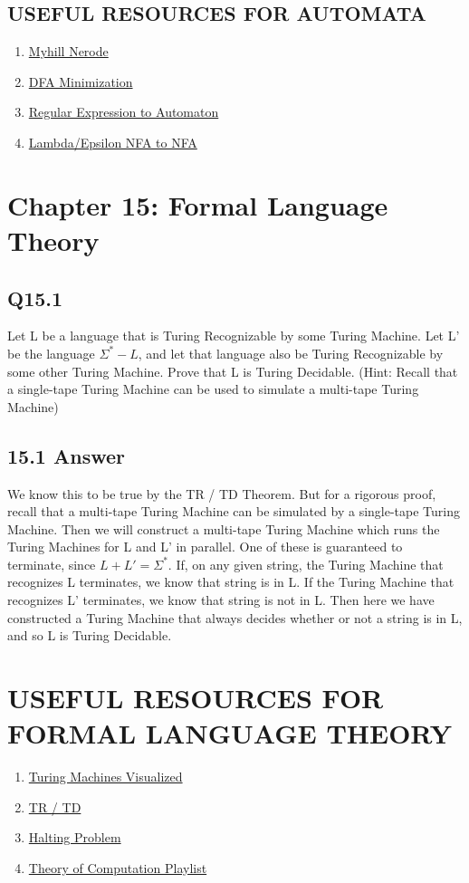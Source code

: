 \documentclass{article}
\begin{document}
\subsection{USEFUL RESOURCES FOR AUTOMATA}
\begin{enumerate}
    \item \href{https://www.youtube.com/watch?v=gjDPTy6fwbk}{Myhill Nerode}
    \item \href{https://www.youtube.com/watch?v=7W2lSrt8r-0&t=703s}{DFA Minimization}
    \item \href{https://www.youtube.com/watch?v=VbR1mGdP99s}{Regular Expression to Automaton}
    \item \href{https://www.youtube.com/watch?v=yXLZ9JbvEEg}{Lambda/Epsilon NFA to NFA}
\end{enumerate}
\newpage
\section*{Chapter 15: Formal Language Theory}
\subsection*{Q15.1}
Let L be a language that is Turing Recognizable by some Turing Machine. Let L' be the language $\Sigma^* - L$,
and let that language also be Turing Recognizable by some other Turing Machine. Prove that L is Turing Decidable.
(Hint: Recall that a single-tape Turing Machine can be used to simulate a multi-tape Turing Machine)
\newpage
\subsection*{15.1 Answer}
We know this to be true by the TR / TD Theorem. But for a rigorous proof, recall that a multi-tape Turing Machine can be simulated by
a single-tape Turing Machine. Then we will construct a multi-tape Turing Machine which runs the Turing Machines for L and L' in parallel. One of these
is guaranteed to terminate, since $L + L' = \Sigma^*$. If, on any given string, the Turing Machine that recognizes L terminates, 
we know that string is in L. If the Turing Machine that recognizes L' terminates, we know that string is not in L. Then here we have
constructed a Turing Machine that always decides whether or not a string is in L, and so L is Turing Decidable.
\newpage
\section*{USEFUL RESOURCES FOR FORMAL LANGUAGE THEORY}
\begin{enumerate}
    \item \href{https://www.youtube.com/watch?v=-ZS_zFg4w5k}{Turing Machines Visualized}
    \item \href{https://www.youtube.com/watch?v=sNWC1Zz6qcg}{TR / TD}
    \item \href{https://www.youtube.com/watch?v=VyHbd6sx5Po}{Halting Problem}
    \item \href{https://www.youtube.com/watch?v=SV57Yv8BXBc&list=PLhqug0UEsC-IDomfNsn8e3neoy34o8oye}{Theory of Computation Playlist}
\end{enumerate}
\newpage
\end{document}
